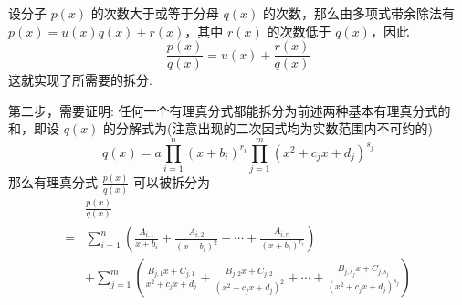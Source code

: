 设分子 $p(x)$ 的次数大于或等于分母 $q(x)$ 的次数，那么由多项式带余除法有 $p(x)=u(x)q(x)+r(x)$，其中 $r(x)$ 的次数低于 $q(x)$，因此
\[ \frac{p(x)}{q(x)} = u(x) + \frac{r(x)}{q(x)} \]
这就实现了所需要的拆分.

第二步，需要证明: 任何一个有理真分式都能拆分为前述两种基本有理真分式的和，即设 $q(x)$ 的分解式为(注意出现的二次因式均为实数范围内不可约的)
\[ q(x) = a \prod_{i=1}^n(x+b_i)^{r_i} \prod_{j=1}^m(x^2+c_j x + d_j)^{s_j} \]
那么有理真分式 $\frac{p(x)}{q(x)}$ 可以被拆分为
\begin{align*}
 & \frac{p(x)}{q(x)} \\
 = & \sum_{i=1}^{n} \left( \frac{A_{i,1}}{x+b_i} + \frac{A_{i,2}}{(x+b_i)^2} + \cdots + \frac{A_{i,r_i}}{(x+b_i)^{r_i}}  \right) \\
 & + \sum_{j=1}^m \left( \frac{B_{j,1}x+C_{j,1}}{x^2+c_j x + d_j} + \frac{B_{j,2}x+C_{j,2}}{(x^2+c_j x + d_j)^2} + \cdots + \frac{B_{j,s_j}x+C_{j,s_j}}{(x^2+c_j x + d_j)^{s_j}} \right)
\end{align*}

